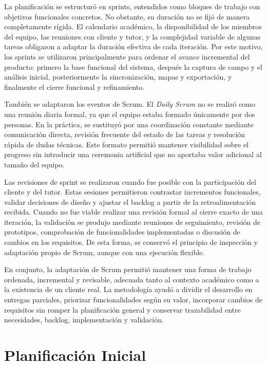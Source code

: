 La planificación se estructuró en sprints, entendidos como bloques de trabajo con
objetivos funcionales concretos. No obstante, su duración no se fijó de manera
completamente rígida. El calendario académico, la disponibilidad de los miembros
del equipo, las reuniones con cliente y tutor, y la complejidad variable de algunas
tareas obligaron a adaptar la duración efectiva de cada iteración. Por este
motivo, los sprints se utilizaron principalmente para ordenar el avance
incremental del producto: primero la base funcional del sistema, después la captura
de campo y el análisis inicial, posteriormente la sincronización, mapas y
exportación, y finalmente el cierre funcional y refinamiento.

También se adaptaron los eventos de Scrum. El \textit{Daily Scrum} no se realizó
como una reunión diaria formal, ya que el equipo estaba formado únicamente por dos
personas. En la práctica, se sustituyó por una coordinación constante mediante
comunicación directa, revisión frecuente del estado de las tareas y resolución
rápida de dudas técnicas. Este formato permitió mantener visibilidad sobre el
progreso sin introducir una ceremonia artificial que no aportaba valor adicional al
tamaño del equipo.

Las revisiones de sprint se realizaron cuando fue posible con la participación del
cliente y del tutor. Estas sesiones permitieron contrastar incrementos funcionales,
validar decisiones de diseño y ajustar el backlog a partir de la retroalimentación
recibida. Cuando no fue viable realizar una revisión formal al cierre exacto de una
iteración, la validación se produjo mediante reuniones de seguimiento, revisión de
prototipos, comprobación de funcionalidades implementadas o discusión de cambios en
los requisitos. De esta forma, se conservó el principio de inspección y adaptación
propio de Scrum, aunque con una ejecución flexible.

En conjunto, la adaptación de Scrum permitió mantener una forma de trabajo
ordenada, incremental y revisable, adecuada tanto al contexto académico como a la
existencia de un cliente real. La metodología ayudó a dividir el desarrollo en
entregas parciales, priorizar funcionalidades según su valor, incorporar cambios de
requisitos sin romper la planificación general y conservar trazabilidad entre
necesidades, backlog, implementación y validación.

\section{Planificación Inicial}

